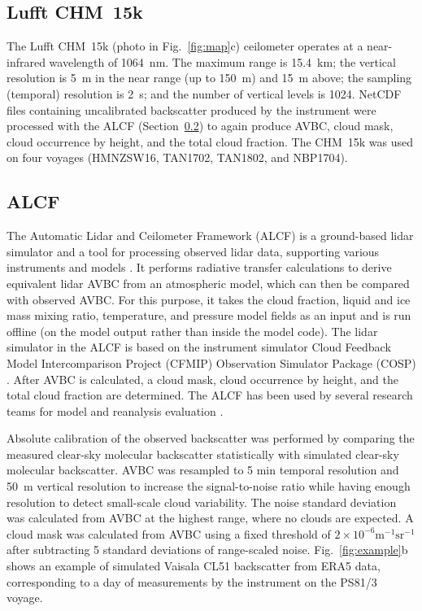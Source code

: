 \documentclass[draft]{agujournal2019}
\begin{document}
\subsection{Lufft CHM~15k}
\label{sec:chm15k}

The Lufft CHM~15k (photo in Fig.~\ref{fig:map}c) ceilometer operates at a near-infrared wavelength of 1064~nm. The maximum range is 15.4~km; the vertical resolution is 5~m in the near range (up to 150~m) and 15~m above; the sampling (temporal) resolution is 2~s; and the number of vertical levels is 1024. NetCDF files containing uncalibrated backscatter produced by the instrument were processed with the ALCF (Section~\ref{sec:alcf}) to again produce AVBC, cloud mask, cloud occurrence by height, and the total cloud fraction. The CHM~15k was used on four voyages (HMNZSW16, TAN1702, TAN1802, and NBP1704).

\subsection{ALCF}
\label{sec:alcf}

The Automatic Lidar and Ceilometer Framework (ALCF) is a ground-based lidar simulator and a tool for processing observed lidar data, supporting various instruments and models \cite{kuma2021}. It performs radiative transfer calculations to derive equivalent lidar AVBC from an atmospheric model, which can then be compared with observed AVBC. For this purpose, it takes the cloud fraction, liquid and ice mass mixing ratio, temperature, and pressure model fields as an input and is run offline (on the model output rather than inside the model code). The lidar simulator in the ALCF is based on the instrument simulator Cloud Feedback Model Intercomparison Project (CFMIP) Observation Simulator Package (COSP) \cite{bodas-salcedo2011}. After AVBC is calculated, a cloud mask, cloud occurrence by height, and the total cloud fraction are determined. The ALCF has been used by several research teams for model and reanalysis evaluation \cite{kuma2020,kremser2021,guyot2022,pei2023,whitehead2023,mcdonald2024a}.

Absolute calibration of the observed backscatter was performed by comparing the measured clear-sky molecular backscatter statistically with simulated clear-sky molecular backscatter. AVBC was resampled to 5 min temporal resolution and 50~m vertical resolution to increase the signal-to-noise ratio while having enough resolution to detect small-scale cloud variability. The noise standard deviation was calculated from AVBC at the highest range, where no clouds are expected. A cloud mask was calculated from AVBC using a fixed threshold of $\mathrm{2\times 10^{-6} m^{-1}sr^{-1}}$ after subtracting 5 standard deviations of range-scaled noise. Fig.~\ref{fig:example}b shows an example of simulated Vaisala CL51 backscatter from ERA5 data, corresponding to a day of measurements by the instrument on the PS81/3 voyage.
\end{document}
